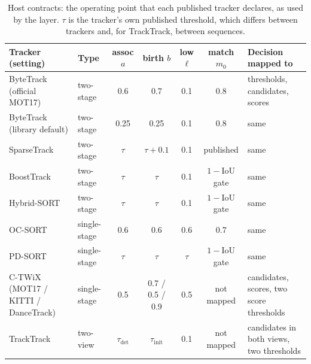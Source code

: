 \begin{table}[t]
\caption{Host contracts: the operating point that each published tracker
declares, as used by the layer. $\tau$ is the tracker's own published
threshold, which differs between trackers and, for TrackTrack, between
sequences.}
\label{tab:contracts}
\centering\footnotesize
\setlength{\tabcolsep}{4pt}
\begin{tabular}{@{}>{\raggedright\arraybackslash}p{30mm}lcccc>{\raggedright\arraybackslash}p{32mm}@{}}
\toprule
Tracker (setting) & Type & assoc $a$ & birth $b$ & low $\ell$ & match $m_0$ & Decision mapped to\\
\midrule
ByteTrack (official MOT17) & two-stage & 0.6 & 0.7 & 0.1 & 0.8 & thresholds, candidates, scores\\
ByteTrack (library default) & two-stage & 0.25 & 0.25 & 0.1 & 0.8 & same\\
SparseTrack & two-stage & $\tau$ & $\tau+0.1$ & 0.1 & published & same\\
BoostTrack & two-stage & $\tau$ & $\tau$ & 0.1 & $1-$IoU gate & same\\
Hybrid-SORT & two-stage & $\tau$ & $\tau$ & 0.1 & $1-$IoU gate & same\\
OC-SORT & single-stage & 0.6 & 0.6 & 0.6 & 0.7 & same\\
PD-SORT & single-stage & $\tau$ & $\tau$ & $\tau$ & $1-$IoU gate & same\\
C-TWiX (MOT17 / KITTI / DanceTrack) & single-stage & 0.5 & 0.7 / 0.5 / 0.9 & 0.5 & not mapped & candidates, scores, two score thresholds\\
TrackTrack & two-view & $\tau_{\mathrm{det}}$ & $\tau_{\mathrm{init}}$ & 0.1 & not mapped & candidates in both views, two thresholds\\
\bottomrule
\end{tabular}
\end{table}
